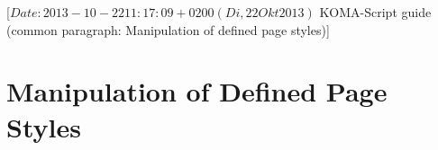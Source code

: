 %
%
%
%
%
%
%
%
% 
%
%
%
%

                 [$Date: 2013-10-22 11:17:09 +0200 (Di, 22 Okt 2013) $
                  KOMA-Script guide (common paragraph: 
                                     Manipulation of defined page styles)]


\section{Manipulation of Defined Page Styles}
\BeginIndexGroup
{}


